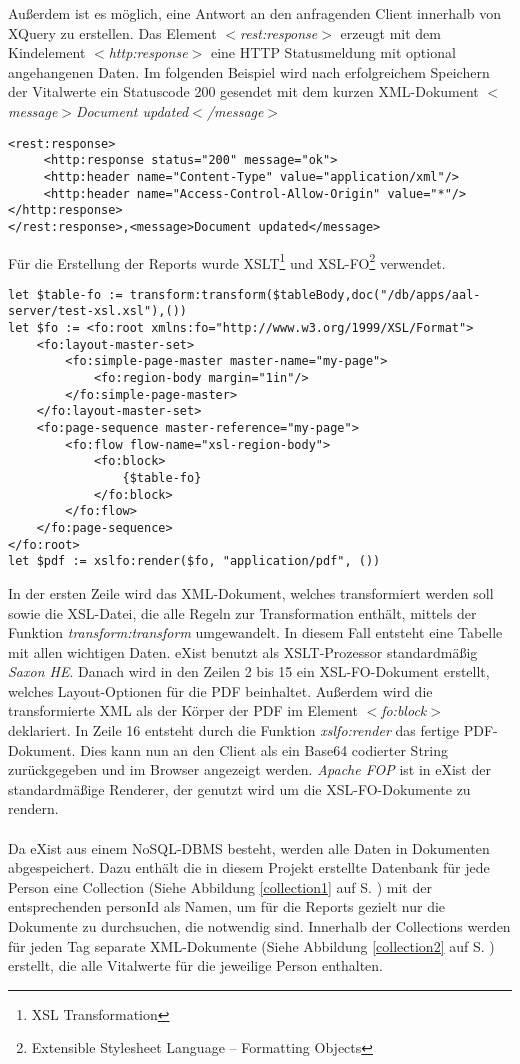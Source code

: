 Außerdem ist es möglich, eine Antwort an den anfragenden Client innerhalb von XQuery zu erstellen. Das Element \textit{$<$rest:response$>$} erzeugt mit dem Kindelement \textit{$<$http:response$>$} eine HTTP Statusmeldung mit optional angehangenen Daten. Im folgenden Beispiel wird nach erfolgreichem Speichern der Vitalwerte ein Statuscode 200 gesendet mit dem kurzen XML-Dokument \textit{$<$message$>$Document updated$<$/message$>$}

\begin{lstlisting}
<rest:response>
     <http:response status="200" message="ok">
     <http:header name="Content-Type" value="application/xml"/>
     <http:header name="Access-Control-Allow-Origin" value="*"/>
</http:response>
</rest:response>,<message>Document updated</message>
\end{lstlisting}

Für die Erstellung der Reports wurde XSLT\footnote[1]{XSL Transformation} und XSL-FO\footnote[2]{Extensible Stylesheet Language – Formatting Objects} verwendet. 

\begin{lstlisting}
let $table-fo := transform:transform($tableBody,doc("/db/apps/aal-server/test-xsl.xsl"),())
let $fo := <fo:root xmlns:fo="http://www.w3.org/1999/XSL/Format">
    <fo:layout-master-set>
        <fo:simple-page-master master-name="my-page">
            <fo:region-body margin="1in"/>
        </fo:simple-page-master>
    </fo:layout-master-set>
    <fo:page-sequence master-reference="my-page">
        <fo:flow flow-name="xsl-region-body">
            <fo:block>
                {$table-fo}
            </fo:block>
        </fo:flow>
    </fo:page-sequence>
</fo:root>
let $pdf := xslfo:render($fo, "application/pdf", ())
\end{lstlisting}

In der ersten Zeile wird das XML-Dokument, welches transformiert werden soll sowie die XSL-Datei, die alle Regeln zur Transformation enthält, mittels der Funktion \textit{transform:transform} umgewandelt. In diesem Fall entsteht eine Tabelle mit allen wichtigen Daten. eXist benutzt als XSLT-Prozessor standardmäßig \textit{Saxon HE}. Danach wird in den Zeilen 2 bis 15 ein XSL-FO-Dokument erstellt, welches Layout-Optionen für die PDF beinhaltet. Außerdem wird die transformierte XML als der Körper der PDF im Element \textit{$<$fo:block$>$} deklariert. In Zeile 16 entsteht durch die Funktion \textit{xslfo:render} das fertige PDF-Dokument. Dies kann nun an den Client als ein Base64 codierter String zurückgegeben und im Browser angezeigt werden. \textit{Apache FOP} ist in eXist der standardmäßige Renderer, der genutzt wird um die XSL-FO-Dokumente zu rendern. 
\\
\\
Da eXist aus einem NoSQL-DBMS besteht, werden alle Daten in Dokumenten abgespeichert. Dazu enthält die in diesem Projekt erstellte Datenbank für jede Person eine Collection (Siehe Abbildung \ref{collection1} auf S. \pageref{collection1}) mit der entsprechenden personId als Namen, um für die Reports gezielt nur die Dokumente zu durchsuchen, die notwendig sind. Innerhalb der Collections werden für jeden Tag separate XML-Dokumente (Siehe Abbildung \ref{collection2} auf S. \pageref{collection2}) erstellt, die alle Vitalwerte für die jeweilige Person enthalten.
